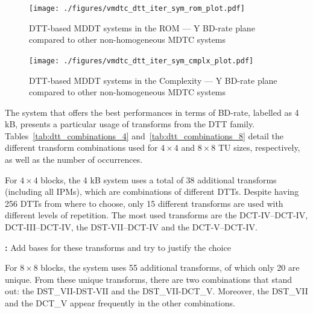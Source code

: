 \documentclass[11pt,a4paper,openright,twoside]{book}
\providecommand{\todo}[1]{
	\begin{center}
		\colorbox{yellowish}{
			\begin{minipage}{0.95\linewidth}
				\textbf{\color{redish}{TODO}:} #1
			\end{minipage}
		}
	\end{center}
}
\numberwithin{equation}{section} %
\numberwithin{figure}{section} %
\numberwithin{table}{section} %
\begin{document}
\begin{figure}[tb]
	\centering
	\texttt{[image: ./figures/vmdtc\_dtt\_iter\_sym\_rom\_plot.pdf]}
	\caption[\acs{DTT}-based \acs{MDDT} systems in the \acs{ROM} --- Y
	\acs{BD}-rate plane]
	{\acs{DTT}-based \acs{MDDT} systems in the \acs{ROM} --- Y
	\acs{BD}-rate plane compared to other non-homogeneous \acs{MDTC} systems}
	\label{fig:vmdtc_dtt_iter_sym_rom}
\end{figure}

\begin{figure}[tb]
	\centering
	\texttt{[image: ./figures/vmdtc\_dtt\_iter\_sym\_cmplx\_plot.pdf]}
	\caption[\acs{DTT}-based \acs{MDDT} systems in the Complexity --- Y
	\acs{BD}-rate plane]
	{\acs{DTT}-based \acs{MDDT} systems in the Complexity --- Y
	\acs{BD}-rate plane compared to other non-homogeneous \acs{MDTC} systems}
	\label{fig:vmdtc_dtt_iter_sym_cmplx}
\end{figure}

The system that offers the best performances in terms of \acs{BD}-rate,
labelled as 4 kB, presents a particular usage of transforms from the \ac{DTT}
family.
Tables~\ref{tab:dtt_combinations_4} and~\ref{tab:dtt_combinations_8} detail
the different transform combinations used for $4\times4$ and $8\times8$
\ac{TU} sizes, respectively, as well as the number of occurrences.

For $4\times4$ blocks, the 4 kB system uses a total of 38 additional
transforms (including all \acp{IPM}), which are combinations of different
\acp{DTT}.
Despite having 256 \acp{DTT} from where to choose, only 15 different
transforms are used with different levels of repetition.
The most used transforms are the \acs{DCT}-IV--\acs{DCT}-IV,
\acs{DCT}-III--\acs{DCT}-IV, the \acs{DST}-VII--\acs{DCT}-IV and the
\acs{DCT}-V--\acs{DCT}-IV.
\todo{Add bases for these transforms and try to justify the choice}

For $8\times8$ blocks, the system uses 55 additional transforms, of which only
20 are unique.
From these unique transforms, there are two combinations that stand out: the
DST\_VII-\acs{DST}-VII and the \acs{DST}\_VII-DCT\_V.
Moreover, the \acs{DST}\_VII and the \acs{DCT}\_V appear frequently in the
other combinations.
\end{document}
